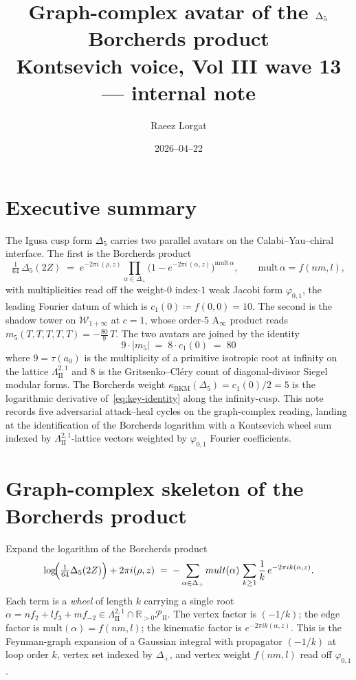 \documentclass[11pt]{article}
\title{Graph-complex avatar of the $\Dlt$ Borcherds product\\
\normalsize Kontsevich voice, Vol III wave 13 --- internal note}
\author{Raeez Lorgat}
\date{2026--04--22}
\newcommand{\kBKM}{\kappa_{\mathrm{BKM}}}
\newcommand{\Winf}{\mathcal{W}_{1+\infty}}
\newcommand{\LII}{\Lambda^{2,1}_{\mathrm{II}}}
\newcommand{\PII}{\mathcal{P}_{\mathrm{II}}}
\newcommand{\phii}{\varphi_{0,1}}
\newcommand{\Dlt}{\Delta_5}
\begin{document}
\maketitle

\section*{Executive summary}

The Igusa cusp form $\Dlt$ carries two parallel avatars on the
Calabi--Yau--chiral interface. The first is the Borcherds product
\[
\tfrac{1}{64}\,\Dlt(2Z) \;=\; e^{-2\pi i\,(\rho,z)}
\prod_{\alpha\in\Delta_+}\!\bigl(1-e^{-2\pi i\,(\alpha,z)}\bigr)^{\mathrm{mult}\,\alpha},
\qquad
\mathrm{mult}\,\alpha=f(nm,l),
\]
with multiplicities read off the weight-$0$ index-$1$ weak Jacobi form
$\phii$, the leading Fourier datum of which is
\(c_1(0) \coloneqq f(0,0) = 10\). The second is the shadow tower on
$\Winf$ at $c=1$, whose order-$5$ A$_\infty$ product reads
$m_5(T,T,T,T,T) = -\tfrac{80}{9}\,T$. The two avatars are joined by
the identity
\begin{equation}\label{eq:key-identity}
\boxed{\;9\cdot |m_5| \;=\; 8\cdot c_1(0) \;=\; 80\;}
\end{equation}
where $9=\tau(a_0)$ is the multiplicity of a primitive isotropic
root at infinity on the lattice $\LII$ and $8$ is the
Gritsenko--Cl{\'e}ry count of diagonal-divisor Siegel modular forms.
The Borcherds weight $\kBKM(\Dlt)=c_1(0)/2=5$ is the logarithmic
derivative of~\eqref{eq:key-identity} along the infinity-cusp. This
note records five adversarial attack--heal cycles on the
graph-complex reading, landing at the identification of the Borcherds
logarithm with a Kontsevich wheel sum indexed by $\LII$-lattice
vectors weighted by $\phii$ Fourier coefficients.

\section{Graph-complex skeleton of the Borcherds product}

Expand the logarithm of the Borcherds product
\[
\log\!\Bigl(\tfrac{1}{64}\Dlt(2Z)\Bigr) + 2\pi i (\rho,z)
\;=\;-\sum_{\alpha\in\Delta_+}\mathrm{mult}(\alpha)\,
\sum_{k\geq 1}\frac{1}{k}\,e^{-2\pi i k(\alpha,z)}.
\]
Each term is a \emph{wheel} of length $k$ carrying a single root
$\alpha=n f_2+l f_3+m f_{-2}\in\LII\cap\mathbb{R}_{>0}\PII$. The
vertex factor is $(-1/k)$; the edge factor is
$\mathrm{mult}(\alpha)=f(nm,l)$; the kinematic factor is
$e^{-2\pi i k (\alpha,z)}$. This is the Feynman-graph expansion of a
Gaussian integral with propagator $(-1/k)$ at loop order $k$, vertex
set indexed by $\Delta_+$, and vertex weight $f(nm,l)$ read off
$\phii$.
\end{document}
